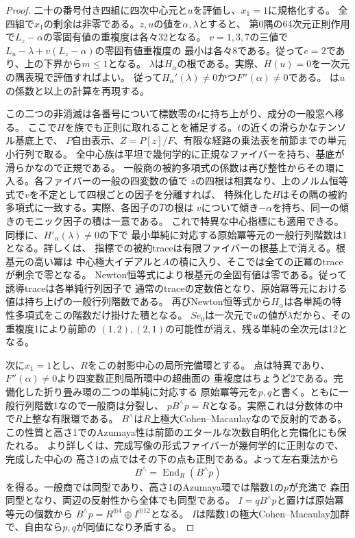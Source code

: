\begin{proof}
二十の番号付き四組に四次中心元と$u$を評価し、$x_1=1$に規格化する。
全四組で$x_1$の剰余は非零である。$z,u$の値を$\alpha,\lambda$とすると、
第0隅の64次元正則作用で$L_z-\alpha$の零固有値の重複度は各々32となる。
$v=1,3,7$の三値で$L_u-\lambda+v(L_z-\alpha)$の零固有値重複度の
最小は各々8である。従って$e=2$であり、上の下界から$m\le1$となる。
$\lambda$は$H_\alpha$の根である。実際、$H(u)=0$を一次元の隅表現で評価すればよい。
従って$H_\alpha'(\lambda)\ne0$かつ$F''(\alpha)\ne0$である。
は$u$の係数と以上の計算を再現する。

この二つの非消滅は各番号について標数零の$t$に持ち上がり、成分の一般窓へ移る。
ここで$H$を族でも正則に取れることを補足する。$t$の近くの滑らかなテンソル基底上で、
$P$自由表示、$Z=P[z]/F$、有限な経路の乗法表を前節までの単元小行列で取る。
全中心族は平坦で幾何学的に正規なファイバーを持ち、基底が滑らかなので正規である。
一般商の被約多項式の係数は再び整性からその環に入る。各ファイバーの一般の四変数の値で
$z$の四根は相異なり、上のノルム恒等式で$v$を不定として四根ごとの因子を分離すれば、
特殊化した$H$はその隅の被約多項式に一致する。実際、各因子の$T$の根は
$v$について傾き$-\alpha$を持ち、同一の傾きのモニック因子の積は一意である。
これで特異な中心指標にも適用できる。同様に、$H'_\alpha(\lambda)\ne0$の下で
最小単純に対応する原始冪等元の一般行列階数は1となる。詳しくは、
指標での被約traceは有限ファイバーの根基上で消える。根基元の高い冪は
中心極大イデアルと$A$の積に入り、そこでは全ての正冪のtraceが剰余で零となる。
Newton恒等式により根基元の全固有値は零である。従って誘導traceは各単純行列因子で
通常のtraceの定数倍となり、原始冪等元における値は持ち上げの一般行列階数である。
再びNewton恒等式から$H_\alpha$は各単純の特性多項式をこの階数だけ掛けた積となる。
$S e_0$は一次元で$u$の値が$\lambda$だから、その重複度1により前節の
$(1,2),(2,1)$の可能性が消え、残る単純の全次元は12となる。

次に$x_1=1$とし、$R$をこの射影中心の局所完備環とする。
点は特異であり、$F''(\alpha)\ne0$より四変数正則局所環中の超曲面の
重複度はちょうど2である。完備化した折り畳み環の二つの単純に対応する
原始冪等元を$p,q$と書く。ともに一般行列階数1なので一般商は分裂し、
$pB^{\wedge}p=R$となる。実際これは分数体の中で$R$上整な有限環である。
$B^{\wedge}$は$R$上極大Cohen--Macaulayなので反射的である。
この性質と高さ1でのAzumaya性は前節のエタールな次数自明化と完備化にも保たれる。
より詳しくは、完成写像の形式ファイバーが幾何学的に正則なので、完成した中心の
高さ1の点ではその下の点も正則である。よって左右乗法から
\[
 B^{\wedge}=\operatorname{End}_R(B^{\wedge}p)
\]
を得る。一般商では同型であり、高さ1のAzumaya環では階数1の$p$が充満で
森田同型となり、両辺の反射性から全体でも同型である。
$I=qB^{\wedge}p$と置けば原始冪等元の個数から
$B^{\wedge}p=R^{\oplus4}\oplus I^{\oplus12}$となる。
$I$は階数1の極大Cohen--Macaulay加群で、自由なら$p,q$が同値になり矛盾する。


\end{proof}
